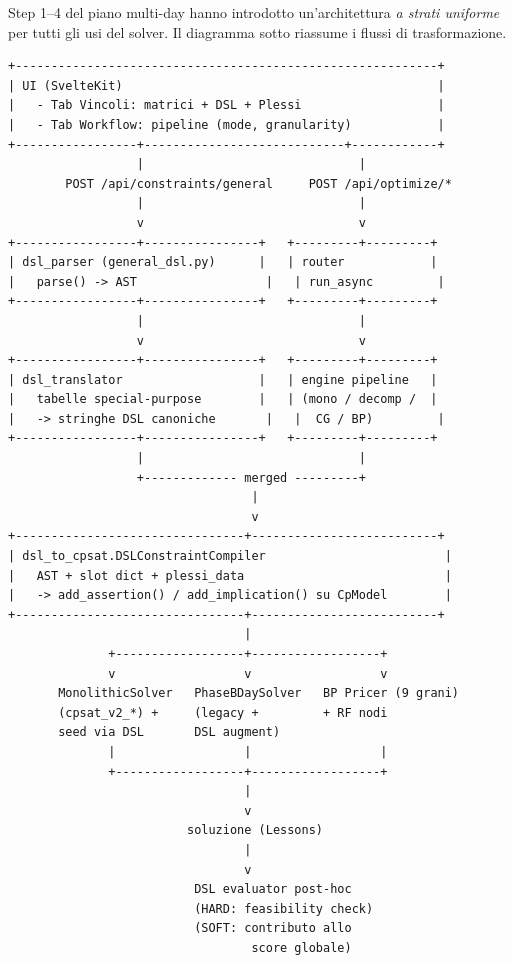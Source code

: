 Step 1--4 del piano multi-day hanno introdotto un'architettura
\emph{a strati uniforme} per tutti gli usi del solver. Il
diagramma sotto riassume i flussi di trasformazione.

\begin{verbatim}
+-----------------------------------------------------------+
| UI (SvelteKit)                                            |
|   - Tab Vincoli: matrici + DSL + Plessi                   |
|   - Tab Workflow: pipeline (mode, granularity)            |
+-----------------+----------------------------+------------+
                  |                              |
        POST /api/constraints/general     POST /api/optimize/*
                  |                              |
                  v                              v
+-----------------+----------------+   +---------+---------+
| dsl_parser (general_dsl.py)      |   | router            |
|   parse() -> AST                  |   | run_async         |
+-----------------+----------------+   +---------+---------+
                  |                              |
                  v                              v
+-----------------+----------------+   +---------+---------+
| dsl_translator                   |   | engine pipeline   |
|   tabelle special-purpose        |   | (mono / decomp /  |
|   -> stringhe DSL canoniche       |   |  CG / BP)         |
+-----------------+----------------+   +---------+---------+
                  |                              |
                  +------------- merged ---------+
                                  |
                                  v
+--------------------------------+--------------------------+
| dsl_to_cpsat.DSLConstraintCompiler                         |
|   AST + slot dict + plessi_data                            |
|   -> add_assertion() / add_implication() su CpModel        |
+--------------------------------+--------------------------+
                                 |
              +------------------+------------------+
              v                  v                  v
       MonolithicSolver   PhaseBDaySolver   BP Pricer (9 grani)
       (cpsat_v2_*) +     (legacy +         + RF nodi
       seed via DSL       DSL augment)
              |                  |                  |
              +------------------+------------------+
                                 |
                                 v
                         soluzione (Lessons)
                                 |
                                 v
                          DSL evaluator post-hoc
                          (HARD: feasibility check)
                          (SOFT: contributo allo
                                  score globale)
\end{verbatim}

